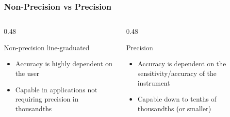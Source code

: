 \begin{frame}
	\frametitle{Non-Precision vs Precision}

    \begin{columns}[t]
        \begin{column}{0.48\linewidth}
            \begin{block}{Non-precision line-graduated}
                \begin{itemize}[<+- | alert@+>]
                    \item{Accuracy is highly dependent on the user}
                    \item{Capable in applications not requiring precision in thousandths}
                \end{itemize}
            \end{block}
        \end{column}
        \begin{column}{0.48\linewidth}
            \begin{block}{Precision}
                \begin{itemize}[<+- | alert@+>]
                    \item{Accuracy is dependent on the sensitivity/accuracy of the instrument}
                    \item{Capable down to tenths of thousandths (or smaller)}
                \end{itemize}
            \end{block}
        \end{column}        
    \end{columns}
\end{frame}

